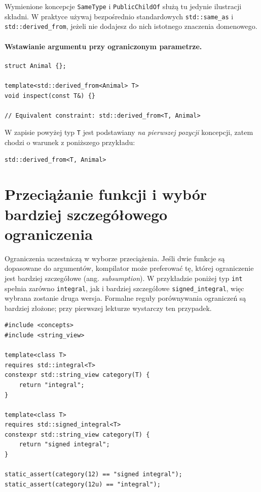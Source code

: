 Wymienione koncepcje \texttt{SameType} i
\texttt{PublicChildOf} służą tu jedynie ilustracji składni.
W praktyce używaj bezpośrednio standardowych
\texttt{std::same\_as} i \texttt{std::derived\_from},
jeżeli nie dodajesz do nich istotnego znaczenia domenowego.

\paragraph{Wstawianie argumentu przy ograniczonym parametrze.}

\begin{lstlisting}
struct Animal {};

template<std::derived_from<Animal> T>
void inspect(const T&) {}

// Equivalent constraint: std::derived_from<T, Animal>
\end{lstlisting}

W zapisie powyżej typ \texttt{T} jest podstawiany
\emph{na pierwszej pozycji} koncepcji, zatem
chodzi o warunek z poniższego przykładu:
\begin{lstlisting}
std::derived_from<T, Animal>
\end{lstlisting}

\section{Przeciążanie funkcji i wybór bardziej szczegółowego ograniczenia}
\label{sec:concepts-przeciazanie}

Ograniczenia uczestniczą w wyborze przeciążenia. Jeśli dwie funkcje
są dopasowane do argumentów, kompilator może preferować tę,
której ograniczenie jest bardziej szczegółowe (ang.
\emph{subsumption}). W przykładzie poniżej typ \texttt{int}
spełnia zarówno \texttt{integral}, jak i bardziej szczegółowe
\texttt{signed\_integral}, więc wybrana zostanie druga wersja.
Formalne reguły porównywania ograniczeń są bardziej złożone;
przy pierwszej lekturze wystarczy ten przypadek.

\begin{lstlisting}
#include <concepts>
#include <string_view>

template<class T>
requires std::integral<T>
constexpr std::string_view category(T) {
    return "integral";
}

template<class T>
requires std::signed_integral<T>
constexpr std::string_view category(T) {
    return "signed integral";
}

static_assert(category(12) == "signed integral");
static_assert(category(12u) == "integral");
\end{lstlisting}


